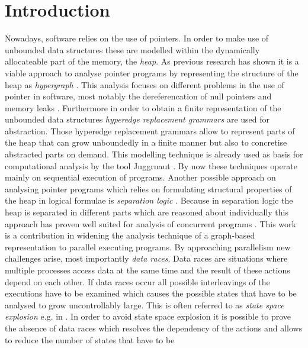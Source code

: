 \section{Introduction}
\label{sec:introduction}
	Nowadays, software relies on the use of pointers. In order to make use of
	unbounded data structures these are modelled within the dynamically
	allocateable part of the memory, the \emph{heap}. As previous research has
	shown it is a viable approach to analyse pointer programs by representing
	the structure of the heap as \emph{hypergraph} \cites{InformalGraphGrammars}
	{InductivePredicates}{ProcedureSummaries}. This analysis focuses on
	different problems in the use of pointer in software, most notably the
	dereferencation of null pointers and memory leaks
	\cites{InformalGraphGrammars}{fmsd}.  Furthermore in order to obtain a
	finite representation of the unbounded data structures \emph{hyperedge
	replacement grammars} are used for abstraction.
	Those hyperedge replacement grammars allow to represent parts of the heap
	that can grow unboundedly in a finite manner but also to concretise
	abstracted parts on demand. This modelling technique is
	already used as basis for computational analysis by the tool Juggrnaut
	\cite{fmsd}. By now these techniques operate mainly on sequential execution
	of programs. Another possible approach on analysing pointer programs which
	relies on formulating structural properties of the heap in logical formulae
	is \emph{separation logic} \cite{PrimerSeparationLogic}. Because in
	separation logic the heap is
	separated in different parts which are reasoned about individually this
	approach has proven well suited for analysis of concurrent programs
	\cites{SeparationLogic}{AbstractSeparationLogic}{LocalReasoning}. This work
	is a contribution in widening the analysis technique of a graph-based
	representation to parallel executing programs. By approaching parallelism
	new challenges arise, most importantly \emph{data races}. Data races are
	situations where multiple processes access data at the same time and the
	result of these actions depend on each other. If data races occur all
	possible interleavings of the executions have to be examined which causes
	the possible states that have to be analysed to grow uncontrollably large.
	This is often
	referred to as \emph{state space explosion} e.g. in \cite[pp. 77-80]
	{PrinciplesOfModelChecking}. In order to avoid state space explosion it is
	possible to prove the absence of data races which resolves the dependency of
	the actions and allows to reduce the number of states that have to be
